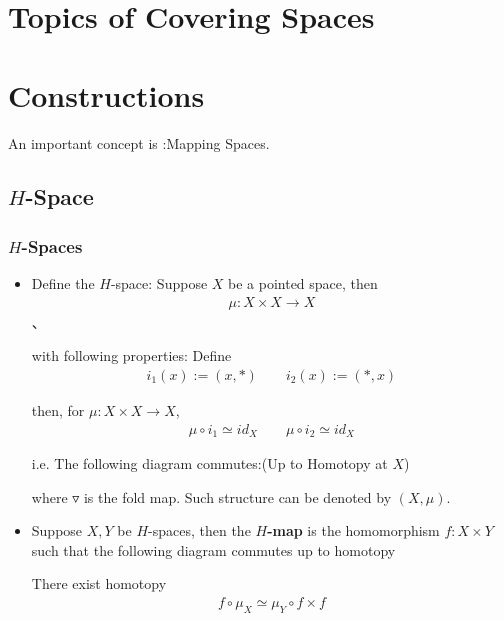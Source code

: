 \documentclass[Total.tex]{subfiles}
\begin{document}
	\chapter{Topics of Covering Spaces}
	\chapter{Constructions}
		An important concept is :Mapping Spaces.
		\section{$H$-Space}
			\subsection{$H$-Spaces}
				\begin{Def}
					\begin{itemize}
						\item 
						Define the $H$-space: Suppose $X$ be a pointed space, then
						\begin{gather*}
							\mu:X\times X\rightarrow X
						\end{gather*}、
						
						with following properties: Define
						\begin{gather*}
							i_1(x):=(x,*)\qquad i_2(x):=(*,x)
						\end{gather*}
						
						then, for $\mu:X\times X\rightarrow X$,
						\begin{gather*}
							\mu\circ i_1\simeq id_X\qquad \mu\circ i_2\simeq id_X
						\end{gather*}
						
						i.e. The following diagram commutes:(Up to Homotopy at $X$)
						\begin{center}
						\end{center}
						
						where $\triangledown$ is the fold map. 
						Such structure can be denoted by $(X,\mu)$.
						\item Suppose $X,Y$ be $H$-spaces, then the \textbf{$H$-map} is the homomorphism $f:X\times Y$ such that the following diagram commutes up to homotopy
						\begin{center}
						\end{center}
						
						There exist homotopy
						\begin{gather*}
							f\circ \mu_X\simeq \mu_Y\circ f\times f
						\end{gather*}
					\end{itemize}
				\end{Def}
				
\end{document}
